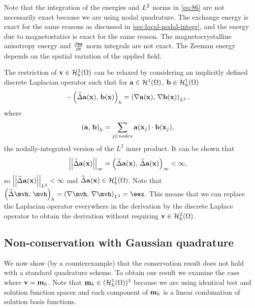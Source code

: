 {Note that the integration of the energies and $\ltwo$ norms in \cref{eq:86} are not necessarily exact because we are using nodal quadrature.
The exchange energy is exact for the same reasons as discussed in \cref{sec:local-nodal-integr}, and the energy due to magnetostatics is exact for the same reason.
The magnetocrystalline anisotropy energy and $\dmdt$ norm integrals are not exact.
The Zeeman energy depends on the spatial variation of the applied field.

The restriction of $\testv \in \sob_h^2(\magd)$ can be relaxed by considering an implicitly defined discrete Laplacian operator such that for $\av \in \sob^1(\magd)$, $\bv \in \ts$
\begin{equation}
  -\ip{\disclap \av(\xv)}{\bv(\xv)}_h = \ltip{\grad \av(\xv)}{\grad \bv(\xv)},
\end{equation}
where
\begin{equation}
  \ip{\av}{\bv}_h = \sum_{j \in nodes} \av(\xv_j) \cdot \bv(\xv_j),
\end{equation}
\ie the nodally-integrated version of the $L^2$ inner product.
It can be shown \cite{Bartels2007} that
\begin{equation}
  \norm{\disclap \av(\xv)}_{\infty} = \ip{\disclap \av(\xv)}{\disclap \av(\xv)}_\infty < \infty,
\end{equation}
so $\norm{\disclap \av(\xv)}_{\ltwo} < \infty$ and $\disclap \av(\xv) \in \ts$.
Note that $\ip{\disclap \mvh}{\mvh}_h = \ltip{\grad \mvh}{\grad \mvh} = \eex$.
This means that we can replace the Laplacian operator everywhere in the derivation by the discrete Laplace operator to obtain the derivation without requiring $\testv \in \sob_h^2(\magd)$.

\subsection{Non-conservation with Gaussian quadrature}
\label{sec:non-cons-gaussian}

We now show (by a counterexample) that the conservation result does not hold with a standard quadrature scheme.
To obtain our result we examine the case where $\testv = \mv_h$.
Note that $\mv_h \in (\ts)^3$ because we are using identical test and solution function spaces and each component of $\mv_h$ is a linear combination of solution basis functions.

}
